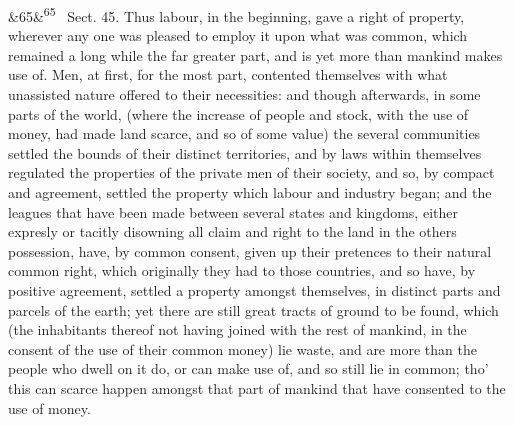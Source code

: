 \documentclass[12pt]{article}
\newcommand{\para}[1][]{\par\noindent\ifx&#1&\else\textsuperscript{\footnotesize #1}~\fi}
\begin{document}
\para[65] Sect. 45. Thus labour, in the beginning, gave a right of property, wherever any one was pleased to employ it upon what was common, which remained a long while the far greater part, and is yet more than mankind makes use of. Men, at first, for the most part, contented themselves with what unassisted nature offered to their necessities: and though afterwards, in some parts of the world, (where the increase of people and stock, with the use of money, had made land scarce, and so of some value) the several communities settled the bounds of their distinct territories, and by laws within themselves regulated the properties of the private men of their society, and so, by compact and agreement, settled the property which labour and industry began; and the leagues that have been made between several states and kingdoms, either expresly or tacitly disowning all claim and right to the land in the others possession, have, by common consent, given up their pretences to their natural common right, which originally they had to those countries, and so have, by positive agreement, settled a property amongst themselves, in distinct parts and parcels of the earth; yet there are still great tracts of ground to be found, which (the inhabitants thereof not having joined with the rest of mankind, in the consent of the use of their common money) lie waste, and are more than the people who dwell on it do, or can make use of, and so still lie in common; tho' this can scarce happen amongst that part of mankind that have consented to the use of money.
\end{document}
